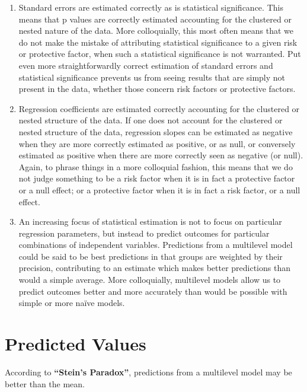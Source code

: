 \documentclass[
  letterpaper,
  DIV=11,
  numbers=noendperiod]{scrreprt}
\providecommand{\tightlist}{%
  \setlength{\itemsep}{0pt}\setlength{\parskip}{0pt}}\usepackage{longtable,booktabs,array}
\begin{document}
\begin{enumerate}
\def\labelenumi{\arabic{enumi}.}
\tightlist
\item
  Standard errors are estimated correctly as is statistical
  significance. This means that p values are correctly estimated
  accounting for the clustered or nested nature of the data. More
  colloquially, this most often means that we do not make the mistake of
  attributing statistical significance to a given risk or protective
  factor, when such a statistical significance is not warranted. Put
  even more straightforwardly correct estimation of standard errors and
  statistical significance prevents us from seeing results that are
  simply not present in the data, whether those concern risk factors or
  protective factors.
\item
  Regression coefficients are estimated correctly accounting for the
  clustered or nested structure of the data. If one does not account for
  the clustered or nested structure of the data, regression slopes can
  be estimated as negative when they are more correctly estimated as
  positive, or as null, or conversely estimated as positive when there
  are more correctly seen as negative (or null). Again, to phrase things
  in a more colloquial fashion, this means that we do not judge
  something to be a risk factor when it is in fact a protective factor
  or a null effect; or a protective factor when it is in fact a risk
  factor, or a null effect.\\
\item
  An increasing focus of statistical estimation is not to focus on
  particular regression parameters, but instead to predict outcomes for
  particular combinations of independent variables. Predictions from a
  multilevel model could be said to be best predictions in that groups
  are weighted by their precision, contributing to an estimate which
  makes better predictions than would a simple average. More
  colloquially, multilevel models allow us to predict outcomes better
  and more accurately than would be possible with simple or more naïve
  models.
\end{enumerate}

\hypertarget{predicted-values}{%
\section{Predicted Values}\label{predicted-values}}

According to \textbf{``Stein's Paradox''}, predictions from a multilevel
model may be better than the mean.
\end{document}

